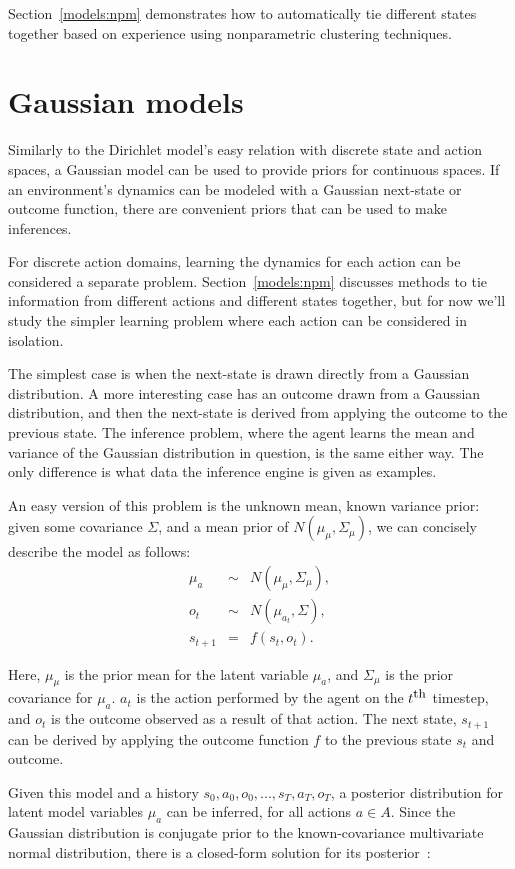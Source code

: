 Section~\ref{models:npm} demonstrates how to automatically tie different states together based on experience using nonparametric clustering techniques.

\section{Gaussian models}

Similarly to the Dirichlet model's easy relation with discrete state and action spaces, a Gaussian model can be used to provide priors for continuous spaces. If an environment's dynamics can be modeled with a Gaussian next-state or outcome function, there are convenient priors that can be used to make inferences.

For discrete action domains, learning the dynamics for each action can be considered a separate problem. Section~\ref{models:npm} discusses methods to tie information from different actions and different states together, but for now we'll study the simpler learning problem where each action can be considered in isolation.

The simplest case is when the next-state is drawn directly from a Gaussian distribution. A more interesting case has an outcome drawn from a Gaussian distribution, and then the next-state is derived from applying the outcome to the previous state. The inference problem, where the agent learns the mean and variance of the Gaussian distribution in question, is the same either way. The only difference is what data the inference engine is given as examples.

An easy version of this problem is the unknown mean, known variance prior: given some covariance $\Sigma$, and a mean prior of $N(\mu_\mu, \Sigma_\mu)$, we can concisely describe the model as follows:
\begin{eqnarray}
\mu_a &\sim& N(\mu_\mu, \Sigma_\mu),\\
o_t &\sim& N(\mu_{a_t}, \Sigma),\\
s_{t+1} &=& f(s_t, o_t).
\end{eqnarray}

Here, $\mu_\mu$ is the prior mean for the latent variable $\mu_a$, and $\Sigma_\mu$ is the prior covariance for $\mu_a$. $a_t$ is the action performed by the agent on the $t^{\mbox{\small th}}$ timestep, and $o_t$ is the outcome observed as a result of that action. The next state, $s_{t+1}$ can be derived by applying the outcome function $f$ to the previous state $s_t$ and outcome.

Given this model and a history $s_0, a_0, o_0, ..., s_T, a_T, o_T$, a posterior distribution for latent model variables $\mu_a$ can be inferred, for all actions $a \in A$. Since the Gaussian distribution is conjugate prior to the known-covariance multivariate normal distribution, there is a closed-form solution for its posterior~\cite{fink1997compendium}:

